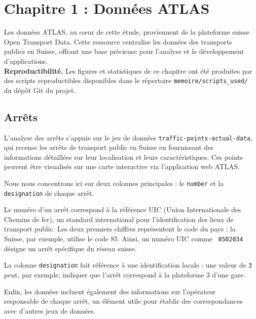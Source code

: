 \chapter{Chapitre 1 : Données ATLAS}

Les données ATLAS, au cœur de cette étude, proviennent de la plateforme suisse Open Transport Data. Cette ressource centralise les données des transports publics en Suisse, offrant une base précieuse pour l'analyse et le développement d'applications.\\

\medskip
\noindent\textbf{Reproductibilité.} Les figures et statistiques de ce chapitre ont été produites par des scripts reproductibles disponibles dans le répertoire \texttt{memoire/scripts\_used/} du dépôt Git du projet.


\section{Arrêts}

L'analyse des arrêts s'appuie sur le jeu de données \texttt{traffic-points-actual-data}, qui recense les arrêts de transport public en Suisse en fournissant des informations détaillées sur leur localisation et leurs caractéristiques. Ces points peuvent être visualisés sur une carte interactive via l'application web ATLAS.

Nous nous concentrons ici sur deux colonnes principales : le \texttt{number} et la \texttt{designation} de chaque arrêt.

Le numéro d’un arrêt correspond à la référence UIC (Union Internationale des Chemins de fer), un standard international pour l'identification des lieux de transport public. Les deux premiers chiffres représentent le code du pays ; la Suisse, par exemple, utilise le code 85. Ainsi, un numéro UIC comme \texttt{ 8502034} désigne un arrêt spécifique du réseau suisse.

La colonne \texttt{designation} fait référence à une identification locale : une valeur de \texttt{3} peut, par exemple, indiquer que l’arrêt correspond à la plateforme 3 d’une gare.

Enfin, les données incluent également des informations sur l’opérateur responsable de chaque arrêt, un élément utile pour établir des correspondances avec d’autres jeux de données.

